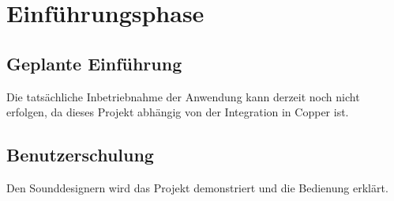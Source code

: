 \section{Einführungsphase}
\label{sec:Einfuehrungsphase}
\subsection{Geplante Einführung}
\label{subsec:EinführungGeplant}
Die tatsächliche Inbetriebnahme der Anwendung kann derzeit noch nicht erfolgen, da dieses Projekt abhängig von der Integration in Copper ist.

\subsection{Benutzerschulung} Den Sounddesignern wird das Projekt demonstriert und die Bedienung erklärt.

